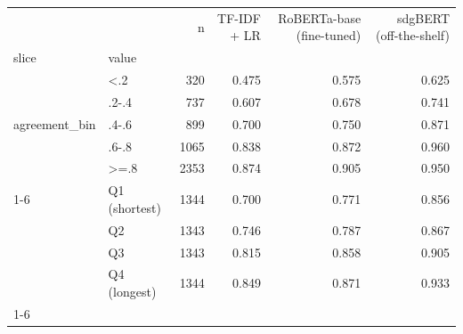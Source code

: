 \begin{tabular}{llrrrr}
\toprule
 &  & n & TF-IDF + LR & RoBERTa-base (fine-tuned) & sdgBERT (off-the-shelf) \\
slice & value &  &  &  &  \\
\midrule
\multirow[t]{5}{*}{agreement_bin} & <.2 & 320 & 0.475 & 0.575 & 0.625 \\
 & .2-.4 & 737 & 0.607 & 0.678 & 0.741 \\
 & .4-.6 & 899 & 0.700 & 0.750 & 0.871 \\
 & .6-.8 & 1065 & 0.838 & 0.872 & 0.960 \\
 & >=.8 & 2353 & 0.874 & 0.905 & 0.950 \\
\cline{1-6}
\multirow[t]{4}{*}{length_bin} & Q1 (shortest) & 1344 & 0.700 & 0.771 & 0.856 \\
 & Q2 & 1343 & 0.746 & 0.787 & 0.867 \\
 & Q3 & 1343 & 0.815 & 0.858 & 0.905 \\
 & Q4 (longest) & 1344 & 0.849 & 0.871 & 0.933 \\
\cline{1-6}
\bottomrule
\end{tabular}
